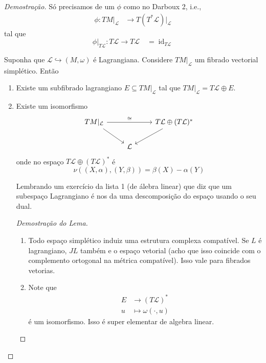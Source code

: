 \begin{proof}[Demostra\c c\~ao]
	S\'o precisamos de um $\phi$ como no Darboux 2, i.e.,
	\begin{align*}
		\phi: TM|_{\mathcal{L}} &\longrightarrow T(T^*\mathcal{L})|_{\mathcal{L}}
	\end{align*}
	tal que
\[\phi|_{T\mathcal{L}}:T\mathcal{L}\to T\mathcal{L}\quad =\operatorname{id}_{T\mathcal{L}}\]

\begin{lemma}
	Suponha que $\mathcal{L}\hookrightarrow (M,\omega)$ \'e Lagrangiana. Considere $TM|_{\mathcal{L}}$ um fibrado vectorial simpl\'etico. Ent\~ao
	\begin{enumerate}
		\item Existe um subfibrado lagrangiano $E\subseteq TM|_{\mathcal{L}}$ tal que $TM|_{\mathcal{L}}=T\mathcal{L}\oplus E$.

		\item Existe um isomorfismo
			\[\begin{tikzcd}
			TM|_{\mathcal{L}}\arrow[rr,"\cong "]\arrow[dr,swap]&&T\mathcal{L}\oplus (T\mathcal{L})^*\arrow[dl]\\
			&\mathcal{L}
			\end{tikzcd}\]
			onde no espaço $T\mathcal{L}\oplus (T\mathcal{L})^*$ \'e
			\[\nu((X,\alpha),(Y,\beta))=\beta(X)-\alpha(Y)\]

			Lembrando um exerc\'icio da lista 1 (de \'alebra linear) que diz que um subespaço Lagrangiano \'e nos da uma descomposi\c c\~ao do espaço usando o seu dual.

			\begin{proof}[Demostra\c c\~ao do Lema]
				\begin{enumerate}[label=\textbf{Step \arabic*}]
					\item Todo espaço simpl\'etico induiz uma estrutura complexa compat\'ivel.  Se $L$ \'e lagrangiano, $JL$ tamb\'em e o espaço vetorial (acho que isso coincide com o complemento ortogonal na m\'etrica compat\'ivel). Isso vale para fibrados vetorias.

					\item Note que 
						\begin{align*}
							E &\longrightarrow (T\mathcal{L})^* \\
							u &\longmapsto \omega(\cdot ,u)
						\end{align*}
						\'e um isomorfismo. Isso \'e super elementar de algebra linear.


\end{enumerate}
\end{proof}
\end{enumerate}
\end{lemma}
\end{proof}
